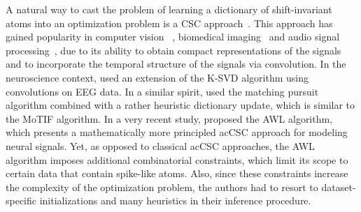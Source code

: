 
A natural way to cast the problem of learning a dictionary of shift-invariant atoms into an optimization problem is a \ac{CSC} approach~\cite{Grosse-etal:2007}. 
This approach has gained popularity in computer vision~\cite{heide2015fast,wohlberg2016efficient,zeiler2010deconvolutional, vsorel2016fast,kavukcuoglu2010learning}%
, biomedical imaging~\cite{pachitariu2013extracting} and audio signal processing~\cite{Grosse-etal:2007,mailhe2008shift},
due to its ability to obtain compact representations of the signals and to incorporate the temporal structure of the signals via convolution.
In the neuroscience context, \citet{barthelemy2013multivariate} used an extension of the K-SVD algorithm using convolutions on EEG data. 
In a similar spirit, \citet{brockmeier2016learning} used the matching pursuit algorithm combined with a rather heuristic  
dictionary update, which is similar to the MoTIF algorithm. 
%
In a very recent study, \citet{hitziger2017adaptive} proposed the AWL algorithm, which presents a mathematically more principled ac{CSC} approach for modeling neural signals. Yet, as opposed to classical ac{CSC} approaches, the AWL algorithm imposes additional combinatorial  constraints, which limit its scope to certain data that contain spike-like atoms. Also, since these constraints increase the complexity of the optimization problem, the authors had to resort to dataset-specific initializations and many heuristics in their inference procedure.

